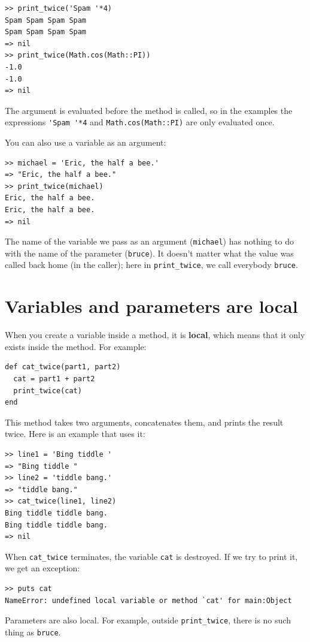 \documentclass[10pt]{book}
\begin{document}
\begin{verbatim}
>> print_twice('Spam '*4)
Spam Spam Spam Spam 
Spam Spam Spam Spam 
=> nil
>> print_twice(Math.cos(Math::PI))
-1.0
-1.0
=> nil
\end{verbatim}
%
The argument is evaluated before the method is called, so
in the examples the expressions \verb"'Spam '*4" and
{\tt Math.cos(Math::PI)} are only evaluated once.

You can also use a variable as an argument:

\begin{verbatim}
>> michael = 'Eric, the half a bee.'
=> "Eric, the half a bee."
>> print_twice(michael)
Eric, the half a bee.
Eric, the half a bee.
=> nil
\end{verbatim}
%
The name of the variable we pass as an argument ({\tt michael}) has
nothing to do with the name of the parameter ({\tt bruce}).  It
doesn't matter what the value was called back home (in the caller);
here in \verb"print_twice", we call everybody {\tt bruce}.


\section{Variables and parameters are local}
\label{methodscope}

When you create a variable inside a method, it is {\bf local},
which means that it only
exists inside the method.  For example:

\begin{verbatim}
def cat_twice(part1, part2)
  cat = part1 + part2
  print_twice(cat)
end
\end{verbatim}
%
This method takes two arguments, concatenates them, and prints
the result twice.  Here is an example that uses it:

\begin{verbatim}
>> line1 = 'Bing tiddle '
=> "Bing tiddle "
>> line2 = 'tiddle bang.'
=> "tiddle bang."
>> cat_twice(line1, line2)
Bing tiddle tiddle bang.
Bing tiddle tiddle bang.
=> nil
\end{verbatim}
%
When \verb"cat_twice" terminates, the variable {\tt cat}
is destroyed.  If we try to print it, we get an exception:

\begin{verbatim}
>> puts cat
NameError: undefined local variable or method `cat' for main:Object
\end{verbatim}
%
Parameters are also local.
For example, outside \verb"print_twice", there is no
such thing as {\tt bruce}.
\end{document}
